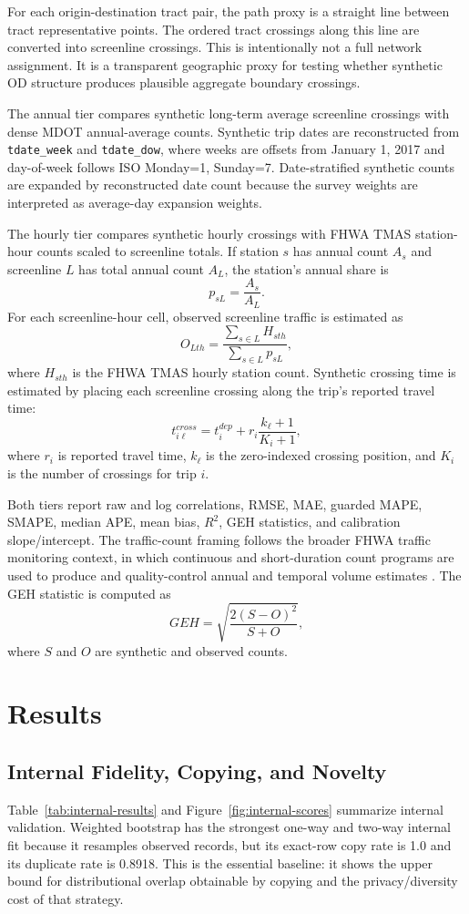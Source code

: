 \documentclass[3p,times,procedia]{elsarticle}
\begin{document}
For each origin-destination tract pair, the path proxy is a straight line between tract representative points. The ordered tract crossings along this line are converted into screenline crossings. This is intentionally not a full network assignment. It is a transparent geographic proxy for testing whether synthetic OD structure produces plausible aggregate boundary crossings.

The annual tier compares synthetic long-term average screenline crossings with dense MDOT annual-average counts. Synthetic trip dates are reconstructed from \texttt{tdate\_week} and \texttt{tdate\_dow}, where weeks are offsets from January 1, 2017 and day-of-week follows ISO Monday=1, Sunday=7. Date-stratified synthetic counts are expanded by reconstructed date count because the survey weights are interpreted as average-day expansion weights.

The hourly tier compares synthetic hourly crossings with FHWA TMAS station-hour counts scaled to screenline totals. If station $s$ has annual count $A_s$ and screenline $L$ has total annual count $A_L$, the station's annual share is
\[
    p_{sL}=\frac{A_s}{A_L}.
\]
For each screenline-hour cell, observed screenline traffic is estimated as
\[
    O_{Lth}=\frac{\sum_{s\in L} H_{sth}}{\sum_{s\in L}p_{sL}},
\]
where $H_{sth}$ is the FHWA TMAS hourly station count. Synthetic crossing time is estimated by placing each screenline crossing along the trip's reported travel time:
\[
    t^{cross}_{i\ell}=t^{dep}_i+r_i\frac{k_\ell+1}{K_i+1},
\]
where $r_i$ is reported travel time, $k_\ell$ is the zero-indexed crossing position, and $K_i$ is the number of crossings for trip $i$.

Both tiers report raw and log correlations, RMSE, MAE, guarded MAPE, SMAPE, median APE, mean bias, $R^2$, GEH statistics, and calibration slope/intercept. The traffic-count framing follows the broader FHWA traffic monitoring context, in which continuous and short-duration count programs are used to produce and quality-control annual and temporal volume estimates \cite{fhwa_traffic_monitoring_guide}. The GEH statistic is computed as
\[
    GEH = \sqrt{\frac{2(S-O)^2}{S+O}},
\]
where $S$ and $O$ are synthetic and observed counts.

\section{Results}\label{sec:results}
\subsection{Internal Fidelity, Copying, and Novelty}
Table~\ref{tab:internal-results} and Figure~\ref{fig:internal-scores} summarize internal validation. Weighted bootstrap has the strongest one-way and two-way internal fit because it resamples observed records, but its exact-row copy rate is 1.0 and its duplicate rate is 0.8918. This is the essential baseline: it shows the upper bound for distributional overlap obtainable by copying and the privacy/diversity cost of that strategy.
\end{document}
